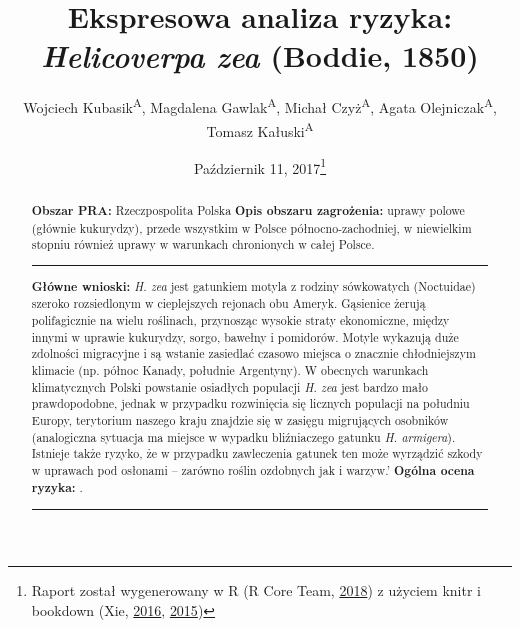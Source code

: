 \documentclass[polish,a4paper]{article}
\title{Ekspresowa analiza ryzyka: \textit{Helicoverpa zea} (Boddie, 1850)}
\author{Wojciech Kubasik\textsuperscript{A}, Magdalena Gawlak\textsuperscript{A}, Michał Czyż\textsuperscript{A}, Agata Olejniczak\textsuperscript{A}, Tomasz Kałuski\textsuperscript{A}}
\date{Październik 11, 2017\footnote{Raport został wygenerowany w R (R Core
  Team, \protect\hyperlink{ref-rcore2018}{2018}) z użyciem knitr i
  bookdown (Xie, \protect\hyperlink{ref-xie2016}{2016},
  \protect\hyperlink{ref-xie2015}{2015})}}
\begin{document}
\begin{abstract}
\begin{tcolorbox}[minipage,colback=Goldenrod,colframe=black,arc=1pt,outer arc=1pt,adjusted title= \textbf{Podsumowanie Analizy Ryzyka Zagrożenia Agrofagiem (Ekspres PRA) dla \textit{Helicoverpa zea}}]
\normalsize
\textbf{Obszar PRA:} Rzeczpospolita Polska\newline
\textbf{Opis obszaru zagrożenia:} uprawy   polowe   (głównie   kukurydzy),   przede   wszystkim   w   Polsce północno-zachodniej, w niewielkim stopniu również uprawy w warunkach chronionych w całej Polsce.\newline
\noindent\rule{\linewidth}{0.5pt}
\textbf{Główne wnioski:} \newline
\textit{H. zea} jest gatunkiem motyla z rodziny sówkowatych (Noctuidae) szeroko rozsiedlonym w cieplejszych rejonach obu Ameryk. Gąsienice żerują polifagicznie na wielu roślinach, przynosząc wysokie straty ekonomiczne, między innymi w uprawie kukurydzy, sorgo, bawełny i pomidorów. Motyle wykazują duże zdolności migracyjne i są wstanie zasiedlać czasowo miejsca o znacznie chłodniejszym klimacie (np. północ Kanady, południe Argentyny). W obecnych warunkach klimatycznych Polski powstanie osiadłych populacji \textit{H. zea}  jest bardzo mało prawdopodobne, jednak w przypadku  rozwinięcia się licznych populacji na południu Europy, terytorium naszego kraju znajdzie się w zasięgu migrujących osobników (analogiczna sytuacja ma miejsce w wypadku bliźniaczego gatunku \textit{H. armigera}). Istnieje także ryzyko, że w przypadku zawleczenia gatunek ten może wyrządzić szkody w uprawach pod osłonami – zarówno roślin ozdobnych jak i warzyw.'\newline
\textbf{Ogólna ocena ryzyka: } .\newline\newline
\noindent\rule{\linewidth}{0.5pt}
  \begin{tcolorbox}[title=\textcolor{black}{\textbf{Ryzyko fitosanitarne dla zagrożonego obszaru:} },after skip=0mm,inherit height,arc=1pt,outer arc=1pt,colframe=Dandelion,colback=Yellow]
    \begin{tcbraster}[raster columns=3,fonttitle=\bfseries,nobeforeafter,colback=Yellow,colframe=Bittersweet,arc=1pt,outer arc=1pt,boxrule=0.5pt,bottomrule=1pt,toprule=1pt,center title]
      \begin{tcolorbox}[adjusted title=Wysokie,halign=flush center]

\end{tcolorbox}
\end{tcbraster}
\end{tcolorbox}
\end{tcolorbox}
\end{abstract}
\end{document}
